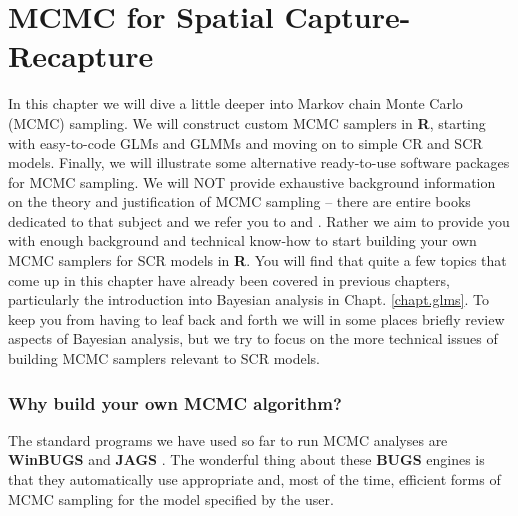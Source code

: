 \chapter{
MCMC for Spatial Capture-Recapture
}
\label{chapt.mcmc}


\vspace{.3in}

In this chapter we will dive a little deeper into Markov chain Monte
Carlo (MCMC) sampling. We will construct custom MCMC samplers in {\bf
  R}, starting with easy-to-code GLMs and GLMMs and moving on to
simple CR and SCR models. Finally, we will illustrate some alternative
ready-to-use software packages for MCMC sampling. We will NOT provide
exhaustive background information on the theory and justification of
MCMC sampling -- there are entire books dedicated to that subject and
we refer you to \citet{robert_casella:2004} and
\citet{robert_casella:2010}. Rather we aim to provide you with enough
background and technical know-how to start building your own MCMC
samplers for SCR models in {\bf R}. You will find that quite a few
topics that come up in this chapter have already been covered in
previous chapters, particularly the introduction into Bayesian
analysis in Chapt. \ref{chapt.glms}. To keep you from having to leaf
back and forth we will in some places briefly review aspects of
Bayesian analysis, but we try to focus on the more technical issues of
building MCMC samplers relevant to SCR models.



\subsection{Why build your own MCMC algorithm?}

The standard programs we have used so far to run MCMC analyses are
{\bf WinBUGS} \citep{gilks_etal:1994} and {\bf JAGS}
\citep{plummer:2003}. The wonderful thing about these {\bf BUGS}
engines
is that they automatically use  appropriate and, most of the time,
efficient forms
of MCMC sampling for the model specified by the user.

